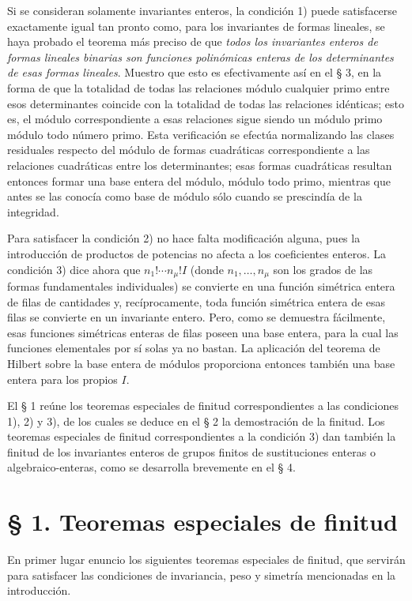 Si se consideran solamente invariantes enteros, la condición 1) puede satisfacerse exactamente igual tan pronto como, para los invariantes de formas lineales, se haya probado el teorema más preciso de que \emph{todos los invariantes enteros de formas lineales binarias son funciones polinómicas enteras de los determinantes de esas formas lineales}. Muestro que esto es efectivamente así en el § 3, en la forma de que la totalidad de todas las relaciones módulo cualquier primo entre esos determinantes coincide con la totalidad de todas las relaciones idénticas; esto es, el módulo correspondiente a esas relaciones sigue siendo un módulo primo módulo todo número primo. Esta verificación se efectúa normalizando las clases residuales respecto del módulo de formas cuadráticas correspondiente a las relaciones cuadráticas entre los determinantes; esas formas cuadráticas resultan entonces formar una base entera del módulo, módulo todo primo, mientras que antes se las conocía como base de módulo sólo cuando se prescindía de la integridad.

Para satisfacer la condición 2) no hace falta modificación alguna, pues la introducción de productos de potencias no afecta a los coeficientes enteros. La condición 3) dice ahora que \(n_1!\cdots n_\mu! I\) (donde \(n_1,\ldots,n_\mu\) son los grados de las formas fundamentales individuales) se convierte en una función simétrica entera de filas de cantidades y, recíprocamente, toda función simétrica entera de esas filas se convierte en un invariante entero. Pero, como se demuestra fácilmente, esas funciones simétricas enteras de filas poseen una base entera, para la cual las funciones elementales por sí solas ya no bastan. La aplicación del teorema de Hilbert sobre la base entera de módulos proporciona entonces también una base entera para los propios \(I\).

El § 1 reúne los teoremas especiales de finitud correspondientes a las condiciones 1), 2) y 3), de los cuales se deduce en el § 2 la demostración de la finitud. Los teoremas especiales de finitud correspondientes a la condición 3) dan también la finitud de los invariantes enteros de grupos finitos de sustituciones enteras o algebraico-enteras, como se desarrolla brevemente en el § 4.

\section*{§ 1. Teoremas especiales de finitud}

En primer lugar enuncio los siguientes teoremas especiales de finitud, que servirán para satisfacer las condiciones de invariancia, peso y simetría mencionadas en la introducción.

